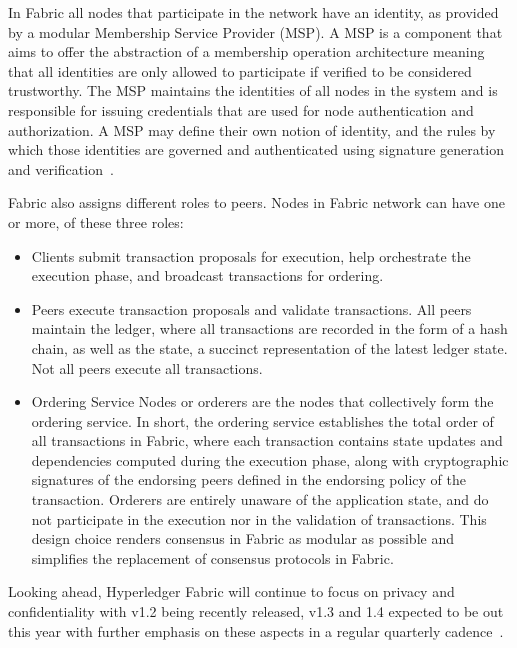 In Fabric all nodes that participate in the network have an identity, as
provided by a modular Membership Service Provider (MSP).  A MSP is a component
that aims to offer the abstraction of a membership operation architecture
meaning that all identities are only allowed to participate if verified to be
considered trustworthy.  The MSP maintains the identities of all nodes in the
system and is responsible for issuing credentials that are used for node
authentication and authorization. A MSP may define their own notion of
identity, and the rules by which those identities are governed and
authenticated using signature generation and
verification~\cite{HyperledgerFabricDocs2017}.

Fabric also assigns different roles to peers. Nodes in Fabric network can have
one or more, of these three roles:

\begin{itemize}
  \item Clients submit transaction proposals for execution, help orchestrate
    the execution phase, and broadcast transactions for ordering.

  \item Peers execute transaction proposals and validate transactions.  All
    peers maintain the ledger, where all transactions  are recorded in the form
    of a hash chain, as well as the state, a succinct representation of the
    latest ledger state. Not all peers execute all transactions.

  \item Ordering Service Nodes or orderers are the nodes that collectively form
    the ordering service. In short, the ordering service establishes the total
    order of all transactions in Fabric, where each transaction contains state
    updates and dependencies computed during the execution phase, along with
    cryptographic signatures of the endorsing peers defined in the endorsing
    policy of the transaction. Orderers are entirely unaware of the application
    state, and do not participate in the execution nor in the validation of
    transactions. This design choice renders consensus in Fabric as modular as
    possible and simplifies the replacement of consensus protocols in Fabric. 
\end{itemize}

Looking ahead, Hyperledger Fabric will continue to focus on privacy and
confidentiality with v1.2 being recently released, v1.3 and 1.4 expected to be
out this year with further emphasis on these aspects in a regular quarterly
cadence~\cite{hyperledgerRoadmap2018}.


